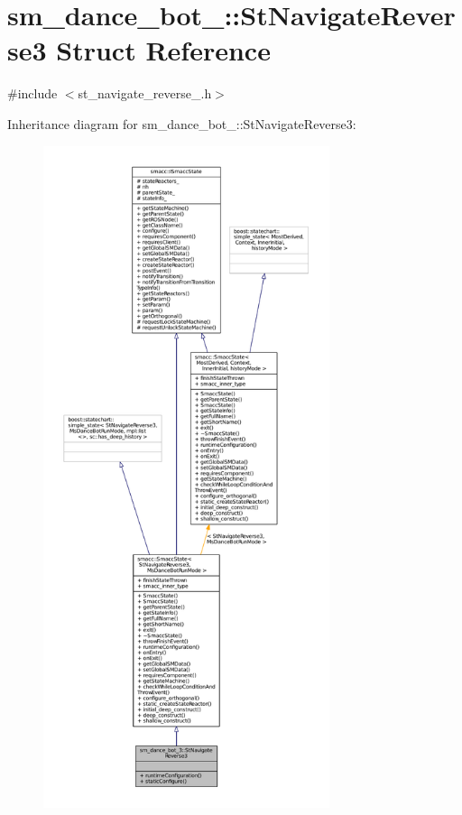 \hypertarget{structsm__dance__bot__3_1_1StNavigateReverse3}{}\section{sm\+\_\+dance\+\_\+bot\+\_\+:\+:St\+Navigate\+Reverse3 Struct Reference}
\label{structsm__dance__bot__3_1_1StNavigateReverse3}


{\ttfamily \#include $<$st\+\_\+navigate\+\_\+reverse\+\_.\+h$>$}



Inheritance diagram for sm\+\_\+dance\+\_\+bot\+\_\+:\+:St\+Navigate\+Reverse3\+:
\nopagebreak
\begin{figure}[H]
\begin{center}
\leavevmode
\includegraphics[height=550pt]{structsm__dance__bot__3_1_1StNavigateReverse3__inherit__graph}
\end{center}
\end{figure}


